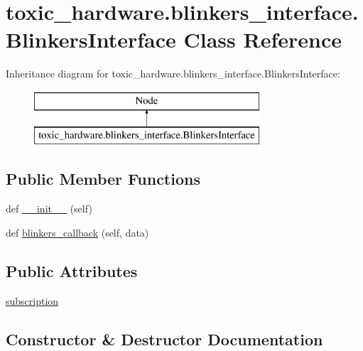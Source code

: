 \hypertarget{classtoxic__hardware_1_1blinkers__interface_1_1BlinkersInterface}{}\section{toxic\+\_\+hardware.\+blinkers\+\_\+interface.\+Blinkers\+Interface Class Reference}
\label{classtoxic__hardware_1_1blinkers__interface_1_1BlinkersInterface}
Inheritance diagram for toxic\+\_\+hardware.\+blinkers\+\_\+interface.\+Blinkers\+Interface\+:\begin{figure}[H]
\begin{center}
\leavevmode
\includegraphics[height=2.000000cm]{db/db2/classtoxic__hardware_1_1blinkers__interface_1_1BlinkersInterface}
\end{center}
\end{figure}
\subsection*{Public Member Functions}
\begin{DoxyCompactItemize}
\item 
def \mbox{\hyperlink{classtoxic__hardware_1_1blinkers__interface_1_1BlinkersInterface_af31adeecd0b6431559368c8dc6caf7ac}{\+\_\+\+\_\+init\+\_\+\+\_\+}} (self)
\item 
def \mbox{\hyperlink{classtoxic__hardware_1_1blinkers__interface_1_1BlinkersInterface_a8297377798830bee8ed08464cafa4d01}{blinkers\+\_\+callback}} (self, data)
\end{DoxyCompactItemize}
\subsection*{Public Attributes}
\begin{DoxyCompactItemize}
\item 
\mbox{\hyperlink{classtoxic__hardware_1_1blinkers__interface_1_1BlinkersInterface_af0442ffa6ff67c8b265b8e0f308d4d13}{subscription}}
\end{DoxyCompactItemize}


\subsection{Constructor \& Destructor Documentation}
\mbox{\label{classtoxic__hardware_1_1blinkers__interface_1_1BlinkersInterface_af31adeecd0b6431559368c8dc6caf7ac}} 
